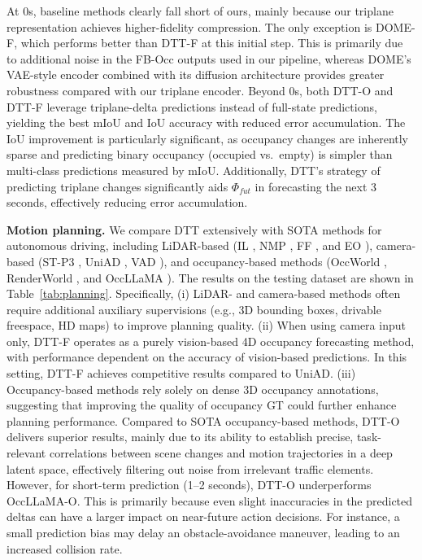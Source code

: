 \documentclass[11pt,a4paper]{article}
\begin{document}
At 0s, baseline methods clearly fall short of ours, mainly because our triplane representation achieves higher-fidelity compression.
The only exception is DOME-F, which performs better than DTT-F at this initial step.
This is primarily due to additional noise in the FB-Occ outputs used in our pipeline, whereas DOME's VAE-style encoder combined with its diffusion architecture provides greater robustness compared with our triplane encoder.
Beyond 0s, both DTT-O and DTT-F leverage triplane-delta predictions instead of full-state predictions, yielding the best mIoU and IoU accuracy with reduced error accumulation.
The IoU improvement is particularly significant, as occupancy changes are inherently sparse and predicting binary occupancy (occupied vs.\ empty) is simpler than multi-class predictions measured by mIoU.
Additionally, DTT's strategy of predicting triplane changes significantly aids $\Phi_{fut}$ in forecasting the next 3 seconds, effectively reducing error accumulation.

\textbf{Motion planning.}
We compare DTT extensively with SOTA methods for autonomous driving, including LiDAR-based (IL \cite{nathandratliff2006}, NMP \cite{wenyuanzeng2019}, FF \cite{peiyunhu2021}, and EO \cite{tarashakhurana2022}), camera-based (ST-P3 \cite{shengchaohu2022}, UniAD \cite{yihanhu2023}, VAD \cite{bojiang2023}), and occupancy-based methods (OccWorld \cite{wenzhaozheng2024}, RenderWorld \cite{ziyangyan2025}, and OccLLaMA \cite{julongwei2024}).
The results on the testing dataset are shown in Table~\ref{tab:planning}.
Specifically, (i) LiDAR- and camera-based methods often require additional auxiliary supervisions (e.g., 3D bounding boxes, drivable freespace, HD maps) to improve planning quality.
(ii) When using camera input only, DTT-F operates as a purely vision-based 4D occupancy forecasting method, with performance dependent on the accuracy of vision-based predictions.
In this setting, DTT-F achieves competitive results compared to UniAD.
(iii) Occupancy-based methods rely solely on dense 3D occupancy annotations, suggesting that improving the quality of occupancy GT could further enhance planning performance.
Compared to SOTA occupancy-based methods, DTT-O delivers superior results, mainly due to its ability to establish precise, task-relevant correlations between scene changes and motion trajectories in a deep latent space, effectively filtering out noise from irrelevant traffic elements.
However, for short-term prediction (1--2 seconds), DTT-O underperforms OccLLaMA-O.
This is primarily because even slight inaccuracies in the predicted deltas can have a larger impact on near-future action decisions.
For instance, a small prediction bias may delay an obstacle-avoidance maneuver, leading to an increased collision rate.
\end{document}
